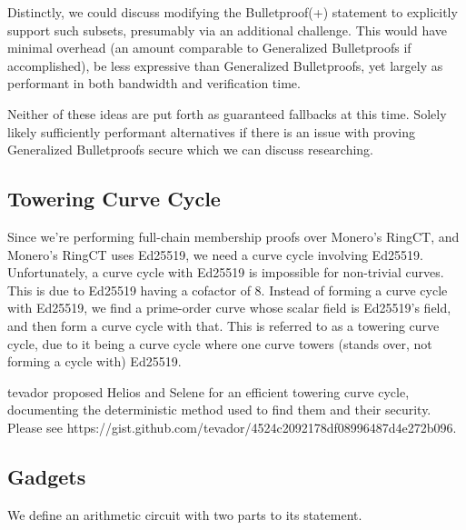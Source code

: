 \documentclass[]{article}
\begin{document}
Distinctly, we could discuss modifying the Bulletproof(+) statement to explicitly support such subsets, presumably via an additional challenge. This would have minimal overhead (an amount comparable to Generalized Bulletproofs if accomplished), be less expressive than Generalized Bulletproofs, yet largely as performant in both bandwidth and verification time.

Neither of these ideas are put forth as guaranteed fallbacks at this time. Solely likely sufficiently performant alternatives if there is an issue with proving Generalized Bulletproofs secure which we can discuss researching.

\subsection{Towering Curve Cycle}

Since we're performing full-chain membership proofs over Monero's RingCT, and Monero's RingCT uses Ed25519, we need a curve cycle involving Ed25519. Unfortunately, a curve cycle with Ed25519 is impossible for non-trivial curves. This is due to Ed25519 having a cofactor of 8. Instead of forming a curve cycle with Ed25519, we find a prime-order curve whose scalar field is Ed25519's field, and then form a curve cycle with that. This is referred to as a towering curve cycle, due to it being a curve cycle where one curve towers (stands over, not forming a cycle with) Ed25519.

tevador proposed Helios and Selene for an efficient towering curve cycle, documenting the deterministic method used to find them and their security. Please see https://gist.github.com/tevador/4524c2092178df08996487d4e272b096.

\subsection{Gadgets}

We define an arithmetic circuit with two parts to its statement.
\end{document}
